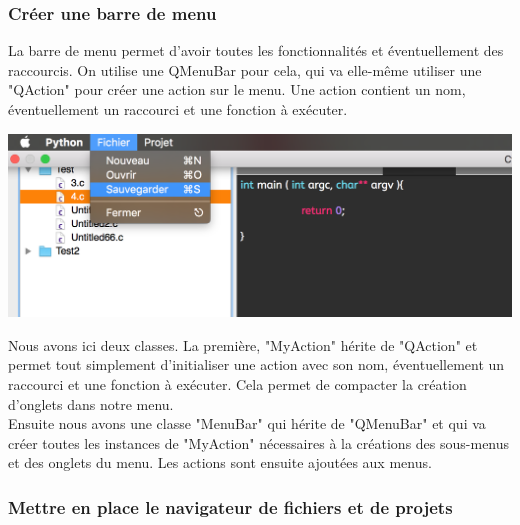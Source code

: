 \documentclass[a4paper,12pt]{article}
\begin{document}
			\subsubsection*{Créer une barre de menu}
			
				La barre de menu permet d'avoir toutes les fonctionnalités et éventuellement des raccourcis. On utilise une QMenuBar pour cela, qui va elle-même utiliser une "QAction" pour créer une action sur le menu. Une action contient un nom, éventuellement un raccourci et une fonction à exécuter. \\
			\begin{center}
				\includegraphics[scale=0.6]{images/QMenuBar}
				\vspace{0.5cm}
			\end{center}
			Nous avons ici deux classes. La première, "MyAction" hérite de "QAction" et permet tout simplement d'initialiser une action avec son nom, éventuellement un raccourci et une fonction à exécuter. Cela permet de compacter la création d'onglets dans notre menu.\\
			Ensuite nous avons une classe "MenuBar" qui hérite de "QMenuBar" et qui va créer toutes les instances de "MyAction" nécessaires à la créations des sous-menus et des onglets du menu. Les actions sont ensuite ajoutées aux menus.\\
			
			\subsubsection*{Mettre en place le navigateur de fichiers et de projets}
			
\end{document}
